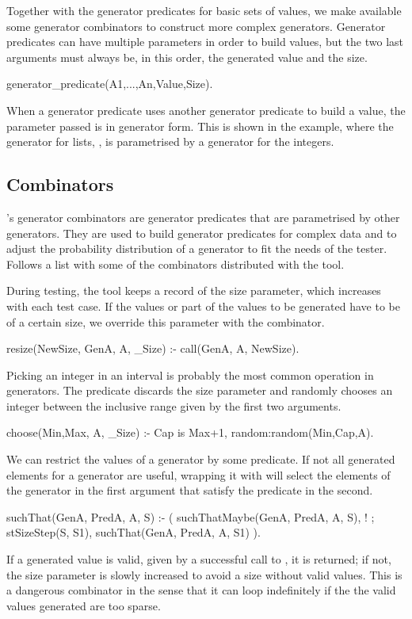 Together with the generator predicates for basic sets of values, we make
available some generator combinators to construct more complex
generators.
%
Generator predicates can have multiple parameters in order to build
values, but the two last arguments must always be, in this order, the
generated value and the size.
%
\begin{yapcode}
 generator_predicate(A1,...,An,Value,Size).
\end{yapcode}
%
When a generator predicate uses another generator predicate to build a
value, the parameter passed is in generator form.
%
This is shown in the example,
where the generator for lists, , is parametrised by a
generator for the integers.


\subsection{Combinators}

\plqc{}'s generator combinators are generator predicates that are
parametrised by other generators.
%
They are used to build generator predicates for complex data and to
adjust the probability distribution of a generator to fit the needs of
the tester.
%
Follows a list with some of the combinators distributed with the tool.


During testing, the tool keeps a record of the size parameter, which
increases with each test case.
%
If the values or part of the values to be generated have to be of a
certain size, we override this parameter with the 
combinator.
%
\begin{yapcode}
 resize(NewSize, GenA, A, _Size) :-
   call(GenA, A, NewSize).
\end{yapcode}


Picking an integer in an interval is probably the most common operation
in generators.
%
The  predicate discards the size parameter and randomly
chooses an integer between the inclusive range given by the first two
arguments.
%
\begin{yapcode}
 choose(Min,Max, A, _Size) :-
   Cap is Max+1,
   random:random(Min,Cap,A).
\end{yapcode}


We can restrict the values of a generator by some predicate.
%
If not all generated elements for a generator are useful, wrapping it
with  will select the elements of the generator in the
first argument that satisfy the predicate in the second.
%
\begin{yapcode}
 suchThat(GenA, PredA, A, S) :-
   (
    suchThatMaybe(GenA, PredA, A, S), !
   ;
    stSizeStep(S, S1),
    suchThat(GenA, PredA, A, S1)            
   ).
\end{yapcode}
%
If a generated value is valid, given by a successful call to
, it is returned; if not, the size parameter is
slowly increased to avoid a size without valid values.
%
This is a dangerous combinator in the sense that it can loop
indefinitely  if the the valid values generated are too sparse.


